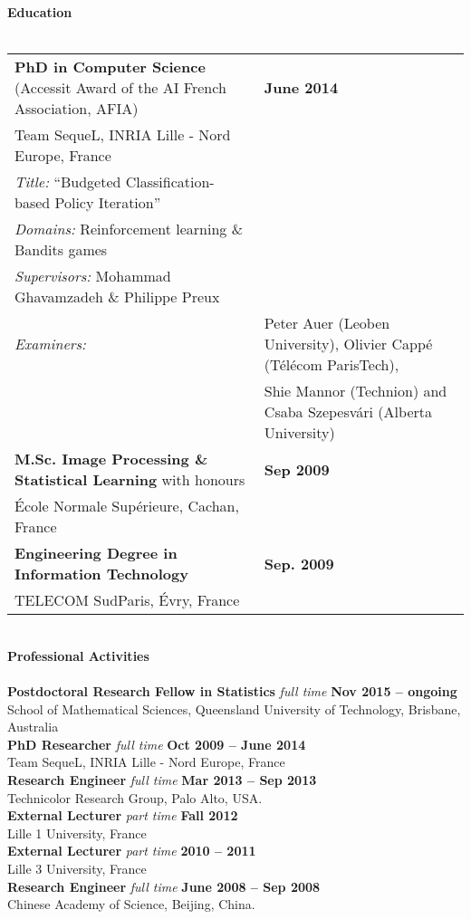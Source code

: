 \noindent\textbf{Education}\\[-.4cm]\noindent\makebox[\linewidth]{\rule{\columnwidth}{0.4pt}}\\[.1cm]
\noindent\begin{tabularx}{\columnwidth}{@{} l X @{}}
\noindent\textbf{PhD in Computer Science} (Accessit Award of the AI French Association, AFIA)& \hfill \textbf{June 2014} \\
Team SequeL, INRIA Lille - Nord Europe, France\\
\textit{Title:} ``Budgeted Classification-based Policy Iteration''\\
\textit{Domains:} Reinforcement learning \& Bandits games\\
\textit{Supervisors:}  Mohammad Ghavamzadeh \&  Philippe Preux\\
\noindent\textit{Examiners:}\begin{tabular}{ll}  &Peter Auer (Leoben University), Olivier Cappé   (Télécom ParisTech), \\
\noindent & Shie Mannor   (Technion)  and Csaba Szepesvári  (Alberta  University)  
\end{tabular}\\[.2cm]
\textbf{M.Sc. Image Processing \& Statistical Learning} with honours &\hfill \textbf{ Sep 2009}\\
 École Normale Supérieure, Cachan, France\\[.2cm]
\textbf{Engineering Degree in Information Technology}  &\hfill \textbf{ Sep. 2009}\\
 TELECOM SudParis, Évry, France
\end{tabularx}\\[.2cm]

\noindent\textbf{Professional Activities}\\[-.4cm]\noindent\makebox[\linewidth]{\rule{\columnwidth}{0.4pt}}\\[.1cm]
\noindent\textbf{Postdoctoral Research Fellow in Statistics} \textit{full time } \hfill \textbf{Nov 2015 -- ongoing} \\
School of Mathematical Sciences, Queensland University of Technology, Brisbane, Australia\\
\noindent\textbf{PhD Researcher} \textit{full time } \hfill \textbf{Oct 2009 -- June 2014}\\
Team SequeL, INRIA Lille - Nord Europe, France\\
\textbf{Research Engineer}  \textit{full time }  \hfill \textbf{ Mar 2013 -- Sep 2013}\\
Technicolor Research Group, Palo Alto, USA.\\
\textbf{External Lecturer} \textit{part time } \hfill \textbf{ Fall 2012}\\
Lille 1 University, France\\
\textbf{External Lecturer} \textit{part time }\hfill \textbf{2010 -- 2011  }\\
Lille 3 University, France\\ 
\textbf{Research Engineer}  \textit{full time }  \hfill \textbf{ June 2008 -- Sep 2008}\\
Chinese Academy of Science, Beijing, China.\\[.2cm] 

